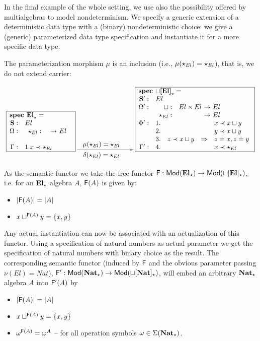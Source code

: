 \begin{example}
In the final example of the whole setting, we use also the possibility
offered by multialgebras to model nondeterminism. 
We specify a 
generic extension of a deterministic data type with a (binary)
nondeterministic choice: we give a (generic) parameterized data type
specification and instantiate it for a more specific data type.

The parameterization morphism $\mu$ is an inclusion (i.e.,
$\mu(\star_{El})=\star_{El}$), that is, we do not extend carrier:

\( \xymatrix{
\frame{\txt{\spec{
	\tit{\mbox{\bf spec\ El}_\cons^{{}}=} \\
		\spSorts{\Sorts} {El}
		\spOps{\Ops}{	\cons_{El}: &&  El \\ \ \\ }
		\Gamma:	&1. x \prec \cons_{El}%
	} } }
\ar[rrr]^<<<<<<<<<<<<<{\txt{\normalsize{$\mu(\cons_{El})=\cons_{El}$}}}_<<<<<<<<<<<<<{\txt{\normalsize{$\delta(\cons_{El})=\cons_{El}$}}}
&&&
\frame{\txt{\spec{
	\tit{\mbox{\bf spec\ $\choice$[El]}_\cons^{{}}=} \\
		\spSorts{\Sorts'} {El}
		\spOps{\Ops'} {
			\choice: & El \times El & El\\
			\cons_{El}: &&  El \\	}
		\Phi':
			&1.& 			&& x \prec x \choice y \\
			&2.& 			&& y \prec x \choice y \\
			&3.& z\prec x\choice y	
					& \To 	 & z \eleq x, z \eleq y\\
		\Gamma':	&4.& && x \prec \cons_{El}\\
	}} }
}
\)

\noindent
As the semantic functor we take the free functor ${\sf {F}}:{\sf {Mod}}({\bf El_\star}) \to
{\sf {Mod}}({\bf \sqcup[El]_\star})$, i.e. for an ${\bf El_\star}$ algebra $A$, 
${\sf {F}}(A)$ is  given by:
\begin{itemize}\MyLPar
\item $|{\sf {F}}(A)| = |A|$
\item $x \sqcup^{{\sf {F}}(A)} y = \{ x,y \}$
\end{itemize}
Any actual instantiation can now be associated with an actualization of this
functor. 
Using a specification of natural numbers as actual parameter we get the
specification of natural numbers with
binary choice as the result. The corresponding semantic functor (induced by
${\sf {F}}$ and the obvious parameter passing $\nu(El)=Nat$), 
${\sf {F'}}:{\sf {Mod}}({\bf Nat_\star}) \to
{\sf {Mod}}({\bf \sqcup[Nat]_\star})$, will embed an arbitrary ${\bf Nat_\star}$
algebra $A$ into ${\sf {F}}'(A)$ by
\begin{itemize}\MyLPar
	\item $|{\sf {F}}(A)| = |A|$
	\item $x \sqcup^{{\sf {F}}(A)} y = \{ x,y \}$
	\item ${\omega}^{{\sf {F}}(A)} = {\omega}^A$ -- for all operation
	symbols $\omega\in\Sigma({\bf Nat_\star})$.
	\end{itemize}
\end{example}
